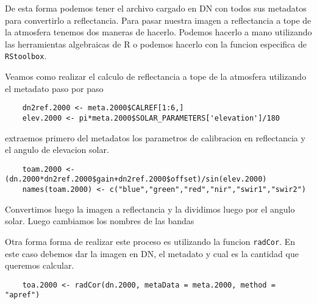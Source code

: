 De esta forma podemos tener el archivo cargado en DN con todos sus metadatos
para convertirlo a reflectancia. Para pasar nuestra imagen a reflectancia a tope
de la atmosfera tenemos dos maneras de hacerlo. Podemos hacerlo a mano
utilizando las herramientas algebraicas de R o podemos hacerlo con la funcion
especifica de \texttt{RStoolbox}.

\begin{exa}
    Veamos como realizar el calculo de reflectancia a tope de la atmosfera
    utilizando el metadato paso por paso

    \begin{lstlisting}
    dn2ref.2000 <- meta.2000$CALREF[1:6,]
    elev.2000 <- pi*meta.2000$SOLAR_PARAMETERS['elevation']/180
    \end{lstlisting}
    extraemos primero del metadatos los parametros de calibracion en
    reflectancia y el angulo de elevacion solar.
    \begin{lstlisting}
    toam.2000 <- (dn.2000*dn2ref.2000$gain+dn2ref.2000$offset)/sin(elev.2000)
    names(toam.2000) <- c("blue","green","red","nir","swir1","swir2")
    \end{lstlisting}
    Convertimos luego la imagen a reflectancia y la dividimos luego por el
    angulo solar. Luego cambiamos los nombres de las bandas

    Otra forma forma de realizar este proceso es utilizando la funcion
    \texttt{radCor}. En este caso debemos dar la imagen en DN, el metadato y
    cual es la cantidad que queremos calcular.

    \begin{lstlisting}
    toa.2000 <- radCor(dn.2000, metaData = meta.2000, method = "apref")
    \end{lstlisting}


\end{exa}
